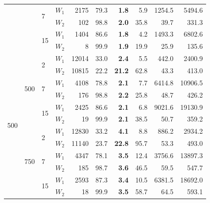 \documentclass[preprint,11pt]{elsarticle}
\theoremstyle{definition}
\begin{document}
\begin{table}
\begin{tabular}{llllrrrrrr}
 &  & \multirow[t]{2}{*}{\num{7}} & $W_1$ & \num{2175} & \num{79.3} & \textbf{\num{1.8}} & \num{5.9} & \num{1254.5} & \num{5494.6} \\
 &  &  & $W_2$ & \num{102} & \num{98.8} & \textbf{\num{2.0}} & \num{35.8} & \num{39.7} & \num{331.3} \\[0.7ex]
 &  & \multirow[t]{2}{*}{\num{15}} & $W_1$ & \num{1404} & \num{86.6} & \textbf{\num{1.8}} & \num{4.2} & \num{1493.3} & \num{6802.6} \\
 &  &  & $W_2$ & \num{8} & \num{99.9} & \textbf{\num{1.9}} & \num{19.9} & \num{25.9} & \num{135.6} \\[2ex]
\multirow[t]{18}{*}{\num{500}} & \multirow[t]{6}{*}{\num{500}} & \multirow[t]{2}{*}{\num{2}} & $W_1$ & \num{12014} & \num{33.0} & \textbf{\num{2.4}} & \num{5.5} & \num{442.0} & \num{2400.9} \\
 &  &  & $W_2$ & \num{10815} & \num{22.2} & \textbf{\num{21.2}} & \num{62.8} & \num{43.3} & \num{413.0} \\[0.7ex]
 &  & \multirow[t]{2}{*}{\num{7}} & $W_1$ & \num{4108} & \num{78.8} & \textbf{\num{2.1}} & \num{7.7} & \num{6414.8} & \num{10906.5} \\
 &  &  & $W_2$ & \num{176} & \num{98.8} & \textbf{\num{2.2}} & \num{25.8} & \num{48.7} & \num{426.2} \\[0.7ex]
 &  & \multirow[t]{2}{*}{\num{15}} & $W_1$ & \num{2425} & \num{86.6} & \textbf{\num{2.1}} & \num{6.8} & \num{9021.6} & \num{19130.9} \\
 &  &  & $W_2$ & \num{19} & \num{99.9} & \textbf{\num{2.1}} & \num{38.5} & \num{50.7} & \num{359.2} \\[1.5ex]
 & \multirow[t]{6}{*}{\num{750}} & \multirow[t]{2}{*}{\num{2}} & $W_1$ & \num{12830} & \num{33.2} & \textbf{\num{4.1}} & \num{8.8} & \num{886.2} & \num{2934.2} \\
 &  &  & $W_2$ & \num{11140} & \num{23.7} & \textbf{\num{22.8}} & \num{95.7} & \num{53.3} & \num{493.0} \\[0.7ex]
 &  & \multirow[t]{2}{*}{\num{7}} & $W_1$ & \num{4347} & \num{78.1} & \textbf{\num{3.5}} & \num{12.4} & \num{3756.6} & \num{13897.3} \\
 &  &  & $W_2$ & \num{185} & \num{98.7} & \textbf{\num{3.6}} & \num{46.5} & \num{59.5} & \num{547.7} \\[0.7ex]
 &  & \multirow[t]{2}{*}{\num{15}} & $W_1$ & \num{2593} & \num{87.3} & \textbf{\num{3.4}} & \num{10.5} & \num{6381.5} & \num{18692.0} \\
 &  &  & $W_2$ & \num{18} & \num{99.9} & \textbf{\num{3.5}} & \num{58.7} & \num{64.5} & \num{593.1} \\[1.5ex]

\end{tabular}
\end{table}
\end{document}

